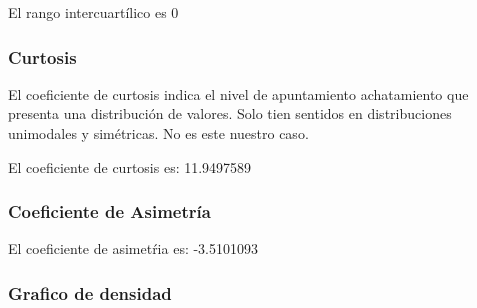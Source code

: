 \documentclass[
]{article}
\newenvironment{Shaded}{\begin{snugshade}}{\end{snugshade}}
\newcommand{\AttributeTok}[1]{\textcolor[rgb]{0.13,0.29,0.53}{#1}}
\newcommand{\ConstantTok}[1]{\textcolor[rgb]{0.56,0.35,0.01}{#1}}
\newcommand{\FunctionTok}[1]{\textcolor[rgb]{0.13,0.29,0.53}{\textbf{#1}}}
\newcommand{\NormalTok}[1]{#1}
\newcommand{\OtherTok}[1]{\textcolor[rgb]{0.56,0.35,0.01}{#1}}
\newcommand{\SpecialCharTok}[1]{\textcolor[rgb]{0.81,0.36,0.00}{\textbf{#1}}}
\begin{document}
\begin{Shaded}
\end{Shaded}

El rango intercuartílico es 0

\hypertarget{curtosis}{%
\subsubsection{Curtosis}\label{curtosis}}

El coeficiente de curtosis indica el nivel de apuntamiento achatamiento
que presenta una distribución de valores. Solo tien sentidos en
distribuciones unimodales y simétricas. No es este nuestro caso.

\begin{Shaded}
\end{Shaded}

El coeficiente de curtosis es: 11.9497589

\hypertarget{coeficiente-de-asimetruxeda}{%
\subsubsection{Coeficiente de
Asimetría}\label{coeficiente-de-asimetruxeda}}

\begin{Shaded}
\end{Shaded}

El coeficiente de asimetŕia es: -3.5101093

\hypertarget{grafico-de-densidad}{%
\subsubsection{Grafico de densidad}\label{grafico-de-densidad}}
\end{document}
